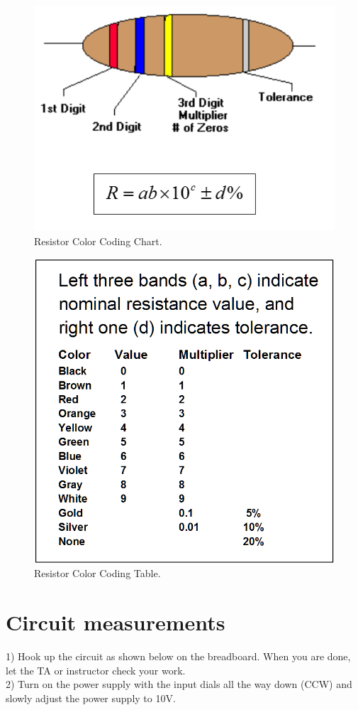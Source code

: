 \documentclass[11pt,letterpaper]{article}
\begin{document}
\begin{figure}
\centering
\includegraphics[width=0.8\linewidth]{Lab1_ResistorColorCoding}
\caption{Resistor Color Coding Chart. }
\label{fig:Lab1_ResistorColorCoding}
\end{figure}

\begin{figure}
\centering
\includegraphics[width=0.6\linewidth]{Lab1_ResistorColorCodingTable}
\caption{Resistor Color Coding Table.}
\label{fig:Lab1_ResistorColorCodingTable}
\end{figure}

\section{Circuit measurements}	

1) Hook up the circuit as shown below on the breadboard. When you are done, let the TA or instructor check your work.\\
2) Turn on the power supply with the input dials all the way down (CCW) and slowly adjust the power supply to 10V.\\
\end{document}
